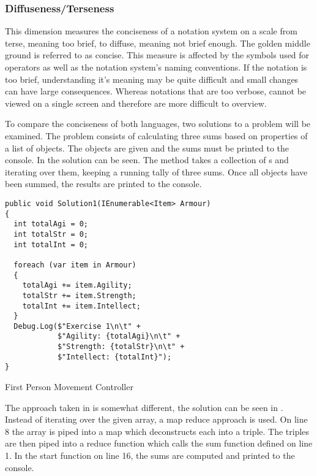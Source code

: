 \subsubsection{Diffuseness/Terseness} %
This dimension measures the conciseness of a notation system on a scale from terse, meaning too brief, to diffuse, meaning not brief enough. The golden middle ground is referred to as concise. This measure is affected by the symbols used for operators as well as the notation system's naming conventions. If the notation is too brief, understanding it's meaning may be quite difficult and small changes can have large consequences. Whereas notations that are too verbose, cannot be viewed on a single screen and therefore are more difficult to overview.

To compare the conciseness of both languages, two solutions to a problem will be examined. The problem consists of calculating three sums based on properties of a list of objects. The objects are given and the sums must be printed to the console. In  the \cs solution can be seen. The method takes a collection of s and iterating over them, keeping a running tally of three sums. Once all objects have been summed, the results are printed to the console.

\begin{listing}[H]
\begin{verbatim}
public void Solution1(IEnumerable<Item> Armour)
{
  int totalAgi = 0;
  int totalStr = 0;
  int totalInt = 0;

  foreach (var item in Armour)
  {
    totalAgi += item.Agility;
    totalStr += item.Strength;
    totalInt += item.Intellect;
  }
  Debug.Log($"Exercise 1\n\t" +
            $"Agility: {totalAgi}\n\t" +
            $"Strength: {totalStr}\n\t" +
            $"Intellect: {totalInt}");
}
\end{verbatim}
\caption{First Person Movement Controller \cs}
\label{lst:cs-armour}
\end{listing}

The approach taken in \fs is somewhat different, the solution can be seen in . Instead of iterating over the given array, a map reduce approach is used. On line 8 the array is piped into a map which deconstructs each  into a triple. The triples are then piped into a reduce function which calls the sum function defined on line 1. In the start function on line 16, the sums are computed and printed to the console.

